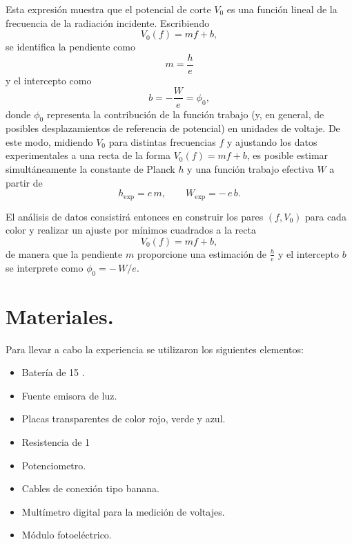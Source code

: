 \documentclass[11pt,twocolumn]{article}
\begin{document}
Esta expresión muestra que el potencial de corte $V_0$ es una función
lineal de la frecuencia de la radiación incidente. Escribiendo
\begin{equation*}
    V_0(f) = m f + b,
\end{equation*}
se identifica la pendiente como
\begin{equation*}
    m = \frac{h}{e}
\end{equation*}
y el intercepto como
\begin{equation*}
    b = -\frac{W}{e} = \phi_0,
\end{equation*}
donde $\phi_0$ representa la contribución de la función trabajo (y, en
general, de posibles desplazamientos de referencia de potencial) en
unidades de voltaje. De este modo, midiendo $V_0$ para distintas
frecuencias $f$ y ajustando los datos experimentales a una recta de la
forma $V_0(f) = mf + b$, es posible estimar simultáneamente la constante
de Planck $h$ y una función trabajo efectiva $W$ a partir de
\begin{equation*}
    h_{\text{exp}} = e\,m,
    \qquad
    W_{\text{exp}} = -\,e\,b.
\end{equation*}

El análisis de datos consistirá
entonces en construir los pares $(f, V_0)$ para cada color y realizar un
ajuste por mínimos cuadrados a la recta
\begin{equation*}
    V_0(f) = m f + b,
\end{equation*}
de manera que la pendiente $m$ proporcione una estimación de
$\tfrac{h}{e}$ y el intercepto $b$ se interprete como
$\phi_0 = -\,W/e$.



\section{Materiales.}

Para llevar a cabo la experiencia se utilizaron los siguientes elementos:

\begin{itemize}
  \item Batería de 15 .
  \item Fuente emisora de luz.
  \item Placas transparentes de color rojo, verde y azul.
  \item Resistencia de 1 
  \item Potenciometro.
  \item Cables de conexión tipo banana.
  \item Multímetro digital para la medición de voltajes.
  \item Módulo fotoeléctrico.
\end{itemize}
\end{document}
